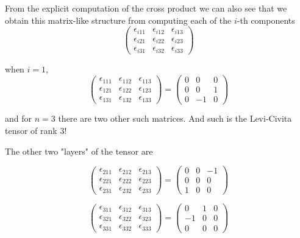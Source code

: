 From the explicit computation of the cross product we can also see that we obtain this matrix-like
structure from computing each of the $i$-th components
$$
\begin{pmatrix}
\epsilon_{i11} & \epsilon_{i12} & \epsilon_{i13} \\
\epsilon_{i21} & \epsilon_{i22} & \epsilon_{i23} \\
\epsilon_{i31} & \epsilon_{i32} & \epsilon_{i33}
\end{pmatrix}
$$

when $i=1$,
$$
\begin{pmatrix}
\epsilon_{111} & \epsilon_{112} & \epsilon_{113} \\
\epsilon_{121} & \epsilon_{122} & \epsilon_{123} \\
\epsilon_{131} & \epsilon_{132} & \epsilon_{133}
\end{pmatrix}
=
\begin{pmatrix}
0 & 0 & 0 \\
0 & 0 & 1 \\
0 & -1 & 0
\end{pmatrix}
$$

and for $n=3$ there are two other such matrices.
And such is the Levi-Civita tensor of rank 3!

The other two "layers" of the tensor are

$$
\begin{pmatrix}
\epsilon_{211} & \epsilon_{212} & \epsilon_{213} \\
\epsilon_{221} & \epsilon_{222} & \epsilon_{223} \\
\epsilon_{231} & \epsilon_{232} & \epsilon_{233}
\end{pmatrix}
=
\begin{pmatrix}
0 & 0 & -1 \\
0 & 0 & 0 \\
1 & 0 & 0
\end{pmatrix}
$$

$$
\begin{pmatrix}
\epsilon_{311} & \epsilon_{312} & \epsilon_{313} \\
\epsilon_{321} & \epsilon_{322} & \epsilon_{323} \\
\epsilon_{331} & \epsilon_{332} & \epsilon_{333}
\end{pmatrix}
=
\begin{pmatrix}
0 & 1 & 0 \\
-1 & 0 & 0 \\
0 & 0 & 0
\end{pmatrix}
$$

